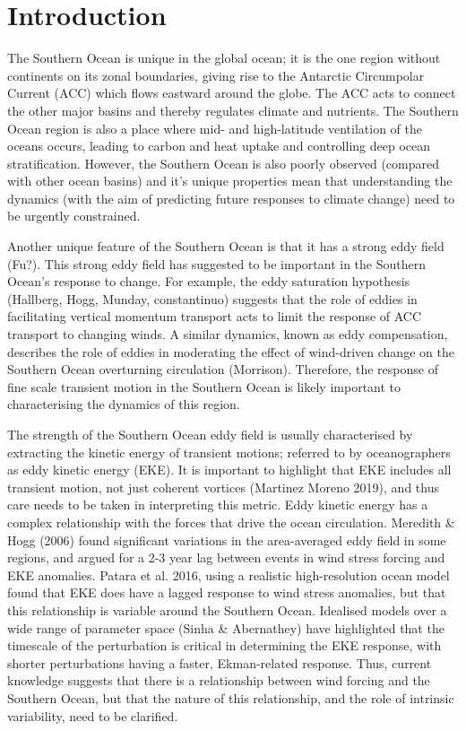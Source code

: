 \documentclass{agujournal2019-navid}
\begin{document}
%
%

\section{Introduction}

The Southern Ocean is unique in the global ocean; it is the one region without continents on its zonal boundaries, giving rise to the Antarctic Circumpolar Current (ACC) which flows eastward around the globe.
The ACC acts to connect the other major basins and thereby regulates climate and nutrients.
The Southern Ocean region is also a place where mid- and high-latitude ventilation of the oceans occurs, leading to carbon and heat uptake and controlling deep ocean stratification.
However, the Southern Ocean is also poorly observed (compared with other ocean basins) and it's unique properties mean that understanding the dynamics (with the aim of predicting future responses to climate change) need to be urgently constrained.

Another unique feature of the Southern Ocean is that it has a strong eddy field (Fu?).
This strong eddy field has suggested to be important in the Southern Ocean's response to change.
For example, the eddy saturation hypothesis (Hallberg, Hogg, Munday, constantinuo) suggests that the role of eddies in facilitating vertical momentum transport acts to limit the response of ACC transport to changing winds.
A similar dynamics, known as eddy compensation, describes the role of eddies in moderating the effect of wind-driven change on the Southern Ocean overturning circulation (Morrison).
Therefore, the response of fine scale transient motion in the Southern Ocean is likely important to characterising the dynamics of this region.

The strength of the Southern Ocean eddy field is usually characterised by extracting the kinetic energy of transient motions; referred to by oceanographers as eddy kinetic energy (EKE). 
It is important to highlight that EKE includes all transient motion, not just coherent vortices (Martinez Moreno 2019), and thus care needs to be taken in interpreting this metric.
Eddy kinetic energy has a complex relationship with the forces that drive the ocean circulation.
Meredith \& Hogg (2006) found significant variations in the area-averaged eddy field in some regions, and argued for a 2-3 year lag between events in wind stress forcing and EKE anomalies.
Patara et al. 2016, using a realistic high-resolution ocean model found that EKE does have a lagged response to wind stress anomalies, but that this relationship is variable around the Southern Ocean.
Idealised models over a wide range of parameter space (Sinha \& Abernathey) have highlighted that the timescale of the perturbation is critical in determining the EKE response, with shorter perturbations having a faster, Ekman-related response.
Thus, current knowledge suggests that there is a relationship between wind forcing and the Southern Ocean, but that the nature of this relationship, and the role of intrinsic variability, need to be clarified.
\end{document}
